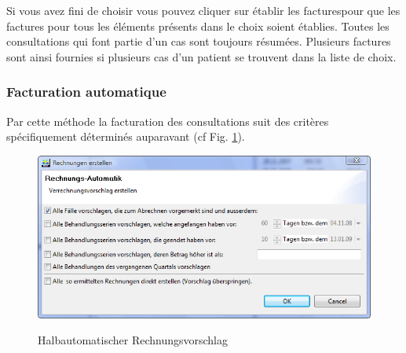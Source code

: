 Si vous avez fini de choisir vous pouvez cliquer sur  \glqq établir les factures\grqq pour que les factures pour tous les éléments présents dans le choix soient établies. Toutes les consultations qui font partie d'un cas sont toujours résumées. Plusieurs factures sont ainsi fournies si plusieurs cas d'un patient  se trouvent dans la liste de choix.

\subsubsection{Facturation automatique}
\label{auto}
Par cette méthode la facturation des consultations suit des critères spécifiquement déterminés auparavant  (cf Fig. \ref{fig:rnautomatik}).
\begin{figure}
  \includegraphics[width=1.0\textwidth]{images/rechnungsautomatik}\\
  \caption{Halbautomatischer Rechnungsvorschlag}\label{fig:rnautomatik}
\end{figure}

